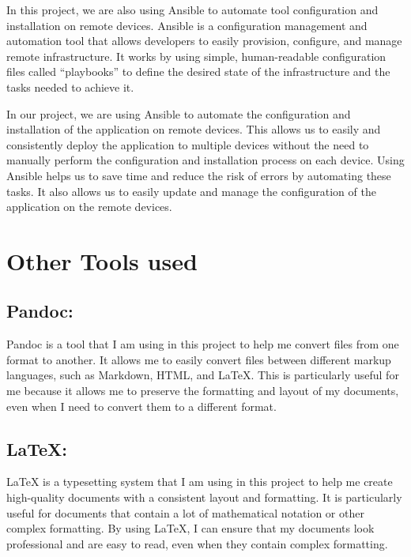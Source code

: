 \documentclass[
  10pt,
  paper=a4,
  ,captions=tableheading
]{scrartcl}
\begin{document}
In this project, we are also using Ansible to automate tool
configuration and installation on remote devices. Ansible is a
configuration management and automation tool that allows developers to
easily provision, configure, and manage remote infrastructure. It works
by using simple, human-readable configuration files called ``playbooks''
to define the desired state of the infrastructure and the tasks needed
to achieve it.

In our project, we are using Ansible to automate the configuration and
installation of the application on remote devices. This allows us to
easily and consistently deploy the application to multiple devices
without the need to manually perform the configuration and installation
process on each device. Using Ansible helps us to save time and reduce
the risk of errors by automating these tasks. It also allows us to
easily update and manage the configuration of the application on the
remote devices.

\hypertarget{other-tools-used}{%
\section{Other Tools used}\label{other-tools-used}}

\hypertarget{pandoc}{%
\subsection{Pandoc:}\label{pandoc}}

Pandoc is a tool that I am using in this project to help me convert
files from one format to another. It allows me to easily convert files
between different markup languages, such as Markdown, HTML, and LaTeX.
This is particularly useful for me because it allows me to preserve the
formatting and layout of my documents, even when I need to convert them
to a different format.

\hypertarget{latex}{%
\subsection{LaTeX:}\label{latex}}

LaTeX is a typesetting system that I am using in this project to help me
create high-quality documents with a consistent layout and formatting.
It is particularly useful for documents that contain a lot of
mathematical notation or other complex formatting. By using LaTeX, I can
ensure that my documents look professional and are easy to read, even
when they contain complex formatting.
\end{document}
